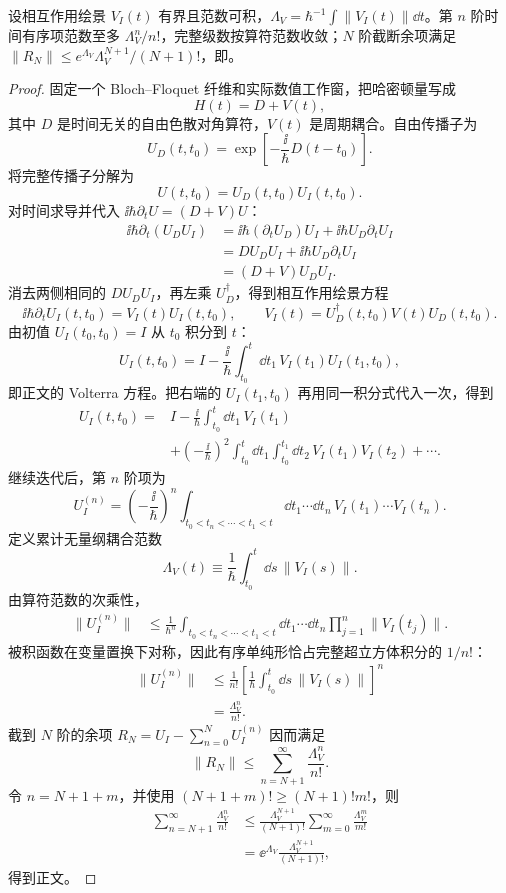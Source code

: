 \begin{theorem}
设相互作用绘景 $V_I(t)$ 有界且范数可积，$\Lambda_V=\hbar^{-1}\int\|V_I(t)\|\dd t$。第 $n$ 阶时间有序项范数至多 $\Lambda_V^n/n!$，完整级数按算符范数收敛；$N$ 阶截断余项满足 $\|R_N\|\le e^{\Lambda_V}\Lambda_V^{N+1}/(N+1)!$，即。
\end{theorem}
\begin{proof}
固定一个 Bloch--Floquet 纤维和实际数值工作窗，把哈密顿量写成
\[
H(t)=D+V(t),
\]
其中 $D$ 是时间无关的自由色散对角算符，$V(t)$ 是周期耦合。自由传播子为
\[
U_D(t,t_0)=\exp\!\left[-\frac{\ii}{\hbar}D(t-t_0)\right].
\]
将完整传播子分解为
\[
U(t,t_0)=U_D(t,t_0)U_I(t,t_0).
\]
对时间求导并代入
$\ii\hbar\partial_tU=(D+V)U$：
\begin{align*}
\ii\hbar\partial_t(U_DU_I)
&=\ii\hbar(\partial_tU_D)U_I+\ii\hbar U_D\partial_tU_I\\
&=DU_DU_I+\ii\hbar U_D\partial_tU_I\\
&=(D+V)U_DU_I.
\end{align*}
消去两侧相同的 $DU_DU_I$，再左乘 $U_D^\dagger$，得到相互作用绘景方程
\[
\ii\hbar\partial_tU_I(t,t_0)=V_I(t)U_I(t,t_0),
\qquad
V_I(t)=U_D^\dagger(t,t_0)V(t)U_D(t,t_0).
\]
由初值 $U_I(t_0,t_0)=I$ 从 $t_0$ 积分到 $t$：
\[
U_I(t,t_0)
=I-\frac{\ii}{\hbar}\int_{t_0}^{t}\dd t_1\,
V_I(t_1)U_I(t_1,t_0),
\]
即正文的 Volterra 方程。把右端的 $U_I(t_1,t_0)$ 再用同一积分式代入一次，得到
\begin{align*}
U_I(t,t_0)
={}&I-\frac{\ii}{\hbar}\int_{t_0}^{t}\dd t_1\,V_I(t_1)\\
&+\left(-\frac{\ii}{\hbar}\right)^2
\int_{t_0}^{t}\dd t_1\int_{t_0}^{t_1}\dd t_2\,
V_I(t_1)V_I(t_2)+\cdots .
\end{align*}
继续迭代后，第 $n$ 阶项为
\[
U_I^{(n)}
=\left(-\frac{\ii}{\hbar}\right)^n
\int_{t_0<t_n<\cdots<t_1<t}
\dd t_1\cdots\dd t_n\,
V_I(t_1)\cdots V_I(t_n).
\]
定义累计无量纲耦合范数
\[
\Lambda_V(t)
\equiv\frac1\hbar\int_{t_0}^{t}\dd s\,\|V_I(s)\|.
\]
由算符范数的次乘性，
\begin{align*}
\|U_I^{(n)}\|
&\le\frac1{\hbar^n}
\int_{t_0<t_n<\cdots<t_1<t}
\dd t_1\cdots\dd t_n
\prod_{j=1}^n\|V_I(t_j)\|.
\end{align*}
被积函数在变量置换下对称，因此有序单纯形恰占完整超立方体积分的 $1/n!$：
\begin{align*}
\|U_I^{(n)}\|
&\le\frac1{n!}
\left[\frac1\hbar\int_{t_0}^{t}\dd s\,\|V_I(s)\|\right]^n\\
&=\frac{\Lambda_V^n}{n!}.
\end{align*}
截到 $N$ 阶的余项 $R_N=U_I-\sum_{n=0}^{N}U_I^{(n)}$ 因而满足
\[
\|R_N\|
\le\sum_{n=N+1}^{\infty}\frac{\Lambda_V^n}{n!}.
\]
令 $n=N+1+m$，并使用
$(N+1+m)!\ge(N+1)!m!$，则
\begin{align*}
\sum_{n=N+1}^{\infty}\frac{\Lambda_V^n}{n!}
&\le\frac{\Lambda_V^{N+1}}{(N+1)!}
\sum_{m=0}^{\infty}\frac{\Lambda_V^m}{m!}\\
&=\ee^{\Lambda_V}\frac{\Lambda_V^{N+1}}{(N+1)!},
\end{align*}
得到正文。
\end{proof}


